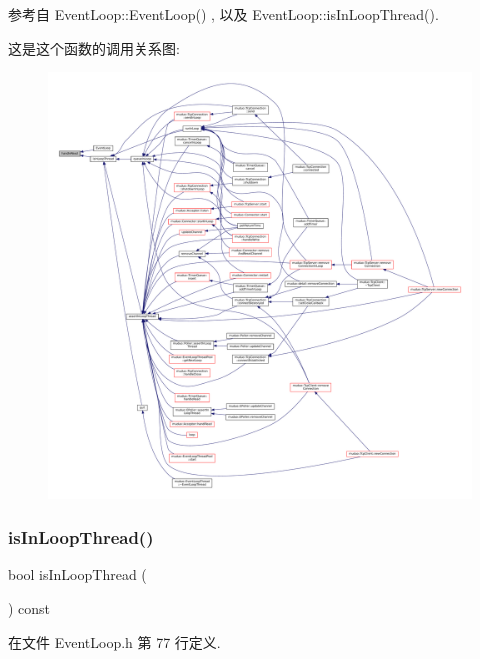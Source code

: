 参考自 Event\+Loop\+::\+Event\+Loop() , 以及 Event\+Loop\+::is\+In\+Loop\+Thread().

这是这个函数的调用关系图\+:
\nopagebreak
\begin{figure}[H]
\begin{center}
\leavevmode
\includegraphics[width=350pt]{classmuduo_1_1EventLoop_a231ec0ec0313193a59b3f1326328ae50_icgraph}
\end{center}
\end{figure}
\mbox{\label{classmuduo_1_1EventLoop_a1da5ae1e094c0136136b5344ef7a3b66}} 
\subsubsection{\texorpdfstring{is\+In\+Loop\+Thread()}{isInLoopThread()}}
{\footnotesize\ttfamily bool is\+In\+Loop\+Thread (\begin{DoxyParamCaption}{ }\end{DoxyParamCaption}) const\hspace{0.3cm}{\ttfamily [inline]}}



在文件 Event\+Loop.\+h 第 77 行定义.



